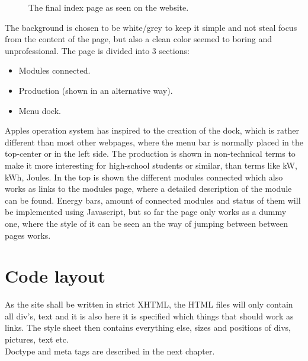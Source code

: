 \begin{figure}[h!]
	\center
		\setlength\fboxsep{0pt}
		\setlength\fboxrule{1pt}
   	\caption{The final index page as seen on the website.}
   	\label{fig:index_page_design}
\end{figure}
The background is chosen to be white/grey to keep it simple and not steal focus from the content of the page, but also a clean color seemed to boring and unprofessional. 
\newpage The page is divided into 3 sections:
\begin{itemize}
	\item Modules connected.
	\item Production (shown in an alternative way).
	\item Menu dock.
\end{itemize}
Apples operation system has inspired to the creation of the dock, which is rather different than most other webpages, where the menu bar is normally placed in the top-center or in the left side. The production is shown in non-technical terms to make it more interesting for high-school students or similar, than terms like kW, kWh, Joules. In the top is shown the different modules connected which also works as links to the modules page, where a detailed description of the module can be found. Energy bars, amount of connected modules and status of them will be implemented using Javascript, but so far the page only works as a dummy one, where the style of it can be seen an the way of jumping between between pages works.  
\section{Code layout}
As the site shall be written in strict XHTML, the HTML files will only contain all div's, text and it is also here it is specified which things that should work as links. The style sheet then contains everything else, sizes and positions of divs, pictures, text etc.
\\Doctype and meta tags are described in the next chapter.
